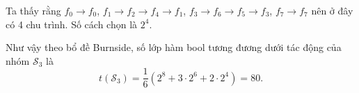 Ta thấy rằng $f_0 \to f_0$, $f_1 \to f_2 \to f_4 \to f_1$, $f_3 \to f_6 \to f_5 \to f_3$, $f_7 \to f_7$ nên ở đây có 4 chu trình. Số cách chọn là $2^4$.

Như vậy theo bổ đề Burnside, số lớp hàm bool tương đương dưới tác động của nhóm $\mathcal{S}_3$ là \[ t (\mathcal{S}_3) = \dfrac{1}{6}(2^8 + 3 \cdot 2^6 + 2 \cdot 2^4) = 80. \]
